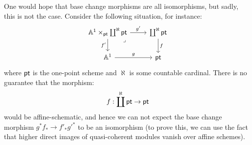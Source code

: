                 \begin{example} \label{example: base_change_bad_behaviour}
                    One would hope that base change morphisms are all isomorphisms, but sadly, this is not the case. Consider the following situation, for instance:
                        $$
                            \begin{tikzcd}
                            	{\A^1 \x_{\pt} \coprod^{\aleph} \pt} & {\coprod^{\aleph} \pt} \\
                            	{\A^1} & \pt
                            	\arrow["{f'}"', from=1-1, to=2-1]
                            	\arrow["g", from=2-1, to=2-2]
                            	\arrow["{g'}", from=1-1, to=1-2]
                            	\arrow["f", from=1-2, to=2-2]
                            	\arrow["\lrcorner"{anchor=center, pos=0.125}, draw=none, from=1-1, to=2-2]
                            \end{tikzcd}
                        $$
                    where $\mathsf{pt}$ is the one-point scheme and $\aleph$ is some countable cardinal. There is no guarantee that the morphism:
                        $$f: \coprod^{\aleph} \mathsf{pt} \to \mathsf{pt}$$
                    would be affine-schematic, and hence we can not expect the base change morphism $g^* f_* \to f'_* g'^*$ to be an isomorphism (to prove this, we can use the fact that higher direct images of quasi-coherent modules vanish over affine schemes).
                \end{example}
                
